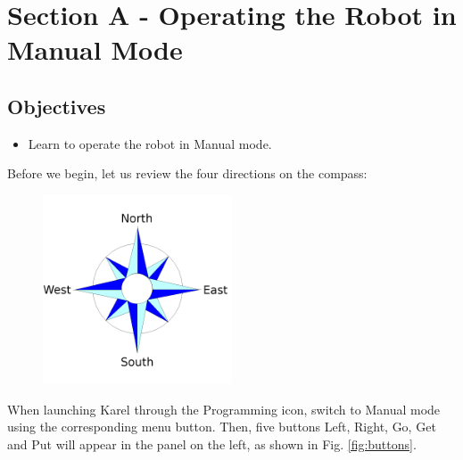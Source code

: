 
\section{Section A - Operating the Robot in Manual Mode} \label{sec:manual}

\subsection{Objectives} 
\begin{itemize}
\item Learn to operate the robot in Manual mode.
\end{itemize}
\noindent
Before we begin, let us review the four directions on the compass:

\begin{figure}[!ht]
\begin{center}
\includegraphics[width=0.5\textwidth]{imgk/compass.png}
\vspace{-0mm}
\end{center}
\vspace{-1cm}
\end{figure}
\noindent
When launching Karel through the Programming icon, switch to Manual mode using the corresponding 
menu button. Then, five buttons Left, Right, Go, Get and Put will appear in the panel on the left,
as shown in Fig. \ref{fig:buttons}.

\newpage

